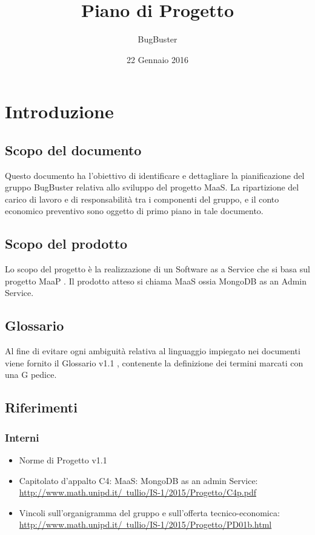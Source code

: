\documentclass[11pt,a4paper]{book}
\title{\textbf{Piano di Progetto}}
\author{BugBuster}
\date{22 Gennaio 2016}
\begin{document}
\maketitle

\tableofcontents





\section{Introduzione}
\subsection{Scopo del documento}
Questo documento ha l’obiettivo di identificare e dettagliare la pianificazione del gruppo BugBuster
relativa allo sviluppo del progetto MaaS. La ripartizione del carico di lavoro e di responsabilità tra i
componenti del gruppo, e il conto economico preventivo sono oggetto di primo piano in tale documento.

\subsection{Scopo del prodotto}
Lo scopo del progetto è la realizzazione di un Software as a Service che si basa sul progetto MaaP . Il prodotto atteso si chiama MaaS ossia MongoDB as an Admin Service.

\subsection{Glossario}
Al fine di evitare ogni ambiguità relativa al linguaggio impiegato nei documenti viene fornito il Glossario
v1.1 , contenente la definizione dei termini marcati con una G pedice.

\subsection{Riferimenti}
\subsubsection{Interni}
\begin{itemize}
\item Norme di Progetto v1.1
\item Capitolato d'appalto C4: MaaS: MongoDB as an admin Service: \\ \hyperlink{http://www.math.unipd.it/~tullio/IS-1/2015/Progetto/C4p.pdf}{http://www.math.unipd.it/~tullio/IS-1/2015/Progetto/C4p.pdf} 
\item Vincoli sull’organigramma del gruppo e sull’offerta tecnico-economica: \\
\hyperlink{http://www.math.unipd.it/~tullio/IS-1/2015/Progetto/PD01b.html}{http://www.math.unipd.it/~tullio/IS-1/2015/Progetto/PD01b.html}
\end{itemize}
\end{document}
